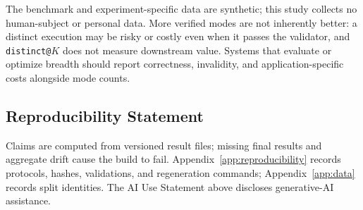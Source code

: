 The benchmark and experiment-specific data are synthetic; this study collects
no human-subject or personal data. More verified modes are not inherently
better: a distinct execution may be risky or costly even when it passes the
validator, and \texttt{distinct@}$K$ does not measure downstream value. Systems
that evaluate or optimize breadth should report correctness, invalidity, and
application-specific costs alongside mode counts.

\subsection{Reproducibility Statement}

Claims are computed from versioned result files; missing final results and aggregate drift cause the build to
fail. Appendix~\ref{app:reproducibility} records protocols, hashes, validations,
and regeneration commands; Appendix~\ref{app:data} records split identities.
The AI Use Statement above discloses generative-AI assistance.


